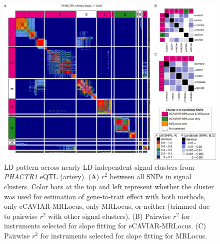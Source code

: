 \documentclass[11pt]{article}
\begin{document}
\begin{figure}[!ht]
  \centering
  \includegraphics[width=\textwidth]{figs/region/heatmap_eQTLbase.Artery_PHACTR1_CAD.20210114.png}
  \caption{LD pattern across nearly-LD-independent signal clusters
    from \emph{PHACTR1} eQTL (artery).
    (A) $r^2$ between all SNPs in signal clusters. Color bars at the
    top and left represent whether the cluster was used for estimation of
    gene-to-trait effect with both methods, only eCAVIAR-MRLocus, only
    MRLocus, or neither (trimmed due to pairwise $r^2$ with other
    signal clusters). (B) Pairwise $r^2$ for instruments selected for
    slope fitting for eCAVIAR-MRLocus. (C) Pairwise $r^2$ for
    instruments selected for slope fitting for MRLocus.}
\end{figure}
\end{document}
